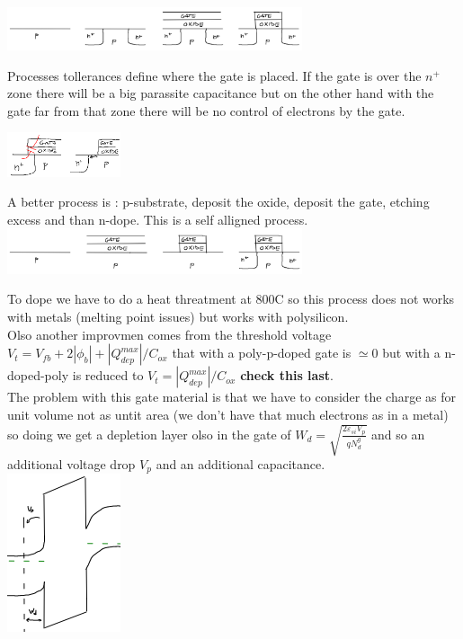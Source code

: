 \centering
\includegraphics[width=0.65\textwidth]{process1.png}\\
\raggedright

Processes tollerances define where the gate is placed. If the gate is over the $n^+$ zone there will be a big parassite capacitance but on the other hand with the gate far from that zone there will be no control of electrons by the gate.

\centering
\includegraphics[width=0.25\textwidth]{process1par.png}\\
\raggedright

A better process is : p-substrate, deposit the oxide, deposit the gate, etching excess and than n-dope. This is a self alligned process.\\

\centering
\includegraphics[width=0.65\textwidth]{process2.png}\\
\raggedright

To dope we have to do a heat threatment at 800C so this process does not works with metals (melting point issues) but works with polysilicon.\\
Olso another improvmen comes from the threshold voltage $V_t=V_{fb}+2|\phi_b|+|Q_{dep}^{max}|/C_{ox}$ that with a poly-p-doped gate is $\simeq 0$ but with a n-doped-poly is reduced to $V_t=|Q_{dep}^{max}|/C_{ox}$ {\bf check this last}.\\
The problem with this gate material is that we have to consider the charge as for unit volume not as untit area (we don't have that much electrons as in a metal) so doing we get a depletion layer olso in the gate of $W_d=\sqrt{\frac{2\varepsilon_{si}V_p}{qN_d^g}}$ and so an additional voltage drop $V_p$ and an additional capacitance.\\

\centering
\includegraphics[width=0.25\textwidth]{polygate.png}\\
\raggedright

